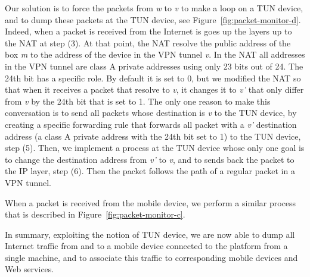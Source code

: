 Our solution is to force the packets from \emph{w} to \emph{v} to make
a loop on a TUN device, and to dump these packets at the TUN device,
see Figure~\ref{fig:packet-monitor-d}. Indeed, when a packet is
received from the Internet is goes up the layers up to the NAT at step
(3). At that point, the NAT resolve the public address of the
\platname{} box \emph{m} to the address of the device in the VPN
tunnel \emph{v}. In the NAT all addresses in the VPN tunnel are class
A private addresses using only 23 bits out of 24. The 24th bit has a
specific role. By default it is set to 0, but we modified the NAT so
that when it receives a packet that resolve to \emph{v}, it changes it
to \emph{v'} that only differ from \emph{v} by the 24th bit that is
set to 1. The only one reason to make this conversation is to send all
packets whose destination is \emph{v} to the TUN device, by creating a
specific forwarding rule that forwards all packet with a \emph{v'}
destination address (a class A private address with the 24th bit set
to 1) to the TUN device, step (5). Then, we implement a process at the
TUN device whose only one goal is to change the destination address
from \emph{v'} to \emph{v}, and to sends back the packet to the IP
layer, step (6). Then the packet follows the path of a regular packet
in a VPN tunnel. 

When a packet is received from the mobile device, we perform a similar
process that is described in Figure~\ref{fig:packet-monitor-c}. 

In summary, exploiting the notion of TUN device, we are now able to
dump all Internet traffic from and to a mobile device connected to the
\platname{} platform from a single machine, and to associate this
traffic to corresponding mobile devices and Web services. 





